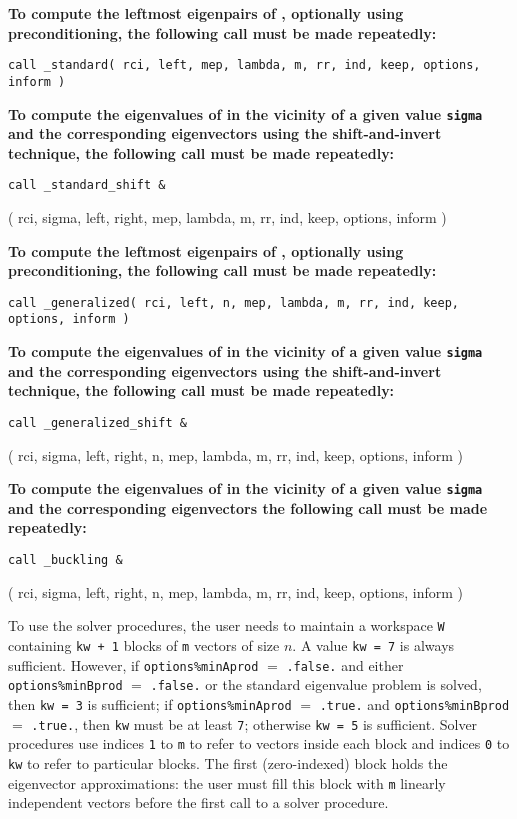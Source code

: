 {\bf
To compute %
the leftmost eigenpairs of ,
optionally using preconditioning,
the following call must be made repeatedly:
}

\medskip
{\tt call
\solver\_standard( rci, left, mep, lambda, m, rr, ind, keep, options, inform )
}

\medskip
\noindent
{\bf
To compute the eigenvalues of  %
in the vicinity of a given value {\tt sigma}
and the corresponding eigenvectors using the shift-and-invert technique,
the following call must be made repeatedly:
}

\medskip
{\tt call
\solver\_standard\_shift \&

\hspace{8mm} 
( rci, sigma, left, right, mep, lambda, m, rr, ind, keep, options, inform )
}

\medskip
\noindent
{\bf
To compute the leftmost eigenpairs of ,
optionally using preconditioning,
the following call must be made repeatedly:
}

\medskip
{\tt call
\solver\_generalized( rci, left, n, mep, lambda, m, rr, ind, 
keep, options, inform )
}

\medskip
\noindent
{\bf
To compute the eigenvalues of  %
in the vicinity of 
a given value {\tt sigma}
and the corresponding eigenvectors using the shift-and-invert technique,
the following call must be made repeatedly:
}

\medskip
{\tt call
\solver\_generalized\_shift \&

\hspace{8mm} 
( rci, sigma, left, right, n, mep, lambda, m, rr, ind, keep, options, inform )
}

\medskip
\noindent
{\bf
To compute the eigenvalues of 
in the vicinity of a given value {\tt sigma}
and the corresponding eigenvectors 
the following call must be made repeatedly:
}

\medskip
{\tt call
\solver\_buckling \&

\hspace{8mm} 
( rci, sigma, left, right, n, mep, lambda, m, rr, ind, keep, options, inform )
}

\medskip
To use the solver procedures,
the user needs to maintain a workspace {\tt W} containing
{\tt kw + 1} blocks of {\tt m} vectors of size $n$.
A value {\tt kw = 7} is always sufficient. 
However, if {\tt options\%minAprod} $=$ {\tt .false.}
and either {\tt options\%minBprod} $=$ {\tt .false.} or 
the standard eigenvalue problem  is solved,
then {\tt kw = 3} is sufficient; 
if 
{\tt options\%minAprod} $=$ {\tt .true.} and
{\tt options\%minBprod} $=$ {\tt .true.},
then {\tt kw} must be at least {\tt 7};
otherwise {\tt kw = 5} is sufficient.
Solver procedures
use indices {\tt 1} to {\tt m} 
to refer to vectors inside each block
and indices {\tt 0} to {\tt kw} 
to refer to particular blocks.
The first (zero-indexed) block holds the eigenvector approximations:
the user must fill this block with 
{\tt m} linearly independent vectors before the first call
to a solver procedure.

